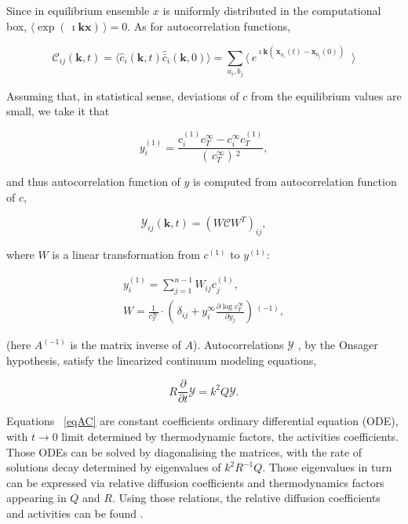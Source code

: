 \documentclass[../main.tex]{subfiles}
\begin{document}
Since in equilibrium ensemble $x$ is uniformly distributed in the computational box, $\langle \exp(\,\imath\mathbf{k}\mathbf{x})\,\rangle=0$. As for autocorrelation functions,

\begin{equation}
    \mathcal{C}_{ij}(\mathbf{k},t )= \langle \hat{c}_i (\mathbf{k},t)  \hat{\bar{c}}_i (\mathbf{k},0) \rangle = \displaystyle\sum_{a_i,b_j} \langle \ e^{  \imath \mathbf{k} ( \,  \mathbf{x}_{a_i}(t)-\mathbf{x}_{b_j}(0) ) \,  }\ \  \rangle
\end{equation}

Assuming that, in statistical sense, deviations of $c$ from the equilibrium values are small, we take it that

\begin{equation}
    \displaystyle y_i^{(1)} = \frac{c_i^{(1)} c_T^{\infty }- c_i^{\infty }c_T^{(1)}}{( \, c_T^{\infty }) \,^2},
\end{equation}

\noindent and thus autocorrelation function of $y$ is computed from autocorrelation function of $c$,

\begin{equation}
    \mathcal{Y}_{ij}(\mathbf{k},t )= ( W \mathcal{C} W^T )_{ij},
\end{equation}

\noindent where $W$ is a linear transformation from $c^{(1)}$ to $y^{(1)}:$

\begin{equation} \begin{array}{l}
    y_i^{(1)} = \sum_{j=1}^{n-1} W_{ij}c_j^{(1)}  ,
    \\
    W  = \frac{1}{c_T^\infty }\cdot  ( \, \delta_{ij} + y_i^{\infty } \frac{\partial  \log  c_T^\infty}{\partial y_j} ) \,^{(-1)},
\end{array} \end{equation}

\noindent (here $A^{(-1)}$ is the matrix inverse of $A$). Autocorrelations $\mathcal{Y}$ , by the Onsager hypothesis, satisfy the linearized continuum modeling equations,

\begin{equation}
    R \frac{\partial }{\partial t} \mathcal{Y} = k^2 Q \mathcal{Y}.
\label{eqAC}
\end{equation}

Equations ~\ref{eqAC} are constant coefficients ordinary differential equation (ODE),  with $t\rightarrow 0$ limit determined by thermodynamic factors, the activities coefficients. Those ODEs can be solved by diagonalising the matrices, with the rate of solutions decay determined by eigenvalues of $k^2 R^{-1} Q.$ Those eigenvalues in turn can be expressed via relative diffusion coefficients and thermodynamics factors appearing in $Q$ and $R.$ Using those relations, the relative diffusion coefficients and activities can be found \cite{mwn2015}.
\end{document}
